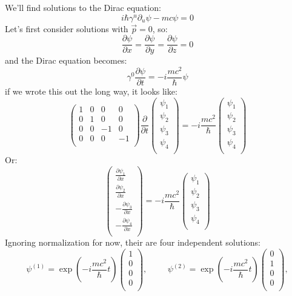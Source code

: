 \documentclass[12pt]{book}
\begin{document}
We'll find solutions to the Dirac equation:
$$i\hbar \gamma^u \partial_u \psi -mc \psi = 0$$
Let's first consider solutions with $\vec{p}=0$, so:
$$\frac{\partial\psi}{\partial x} = \frac{\partial\psi}{\partial y} = \frac{\partial\psi}{\partial z} = 0$$
and the Dirac equation becomes:
$$\gamma^0 \frac{\partial \psi}{\partial t} = -i \frac{mc^2}{\hbar} \psi $$
if we wrote this out the long way, it looks like:
$$
\begin{pmatrix} 
1 & 0 & 0 & 0\\
0 & 1 & 0 & 0\\
0 & 0 &-1 & 0\\
0 & 0 & 0 &-1\\
\end{pmatrix}
\frac{\partial}{\partial t}
\begin{pmatrix} 
\psi_1\\
\psi_2\\
\psi_3\\
\psi_4\\
\end{pmatrix}
=
-i \frac{mc^2}{\hbar}
\begin{pmatrix} 
\psi_1\\
\psi_2\\
\psi_3\\
\psi_4\\
\end{pmatrix}
$$
Or:
$$
\begin{pmatrix} 
\displaystyle \frac{\partial \psi_1}{\partial x}\\[8pt]
\displaystyle \frac{\partial \psi_2}{\partial x}\\[8pt]
\displaystyle -\frac{\partial \psi_3}{\partial x}\\[8pt]
\displaystyle -\frac{\partial \psi_4}{\partial x}\\[8pt]
\end{pmatrix}
=
-i \frac{mc^2}{\hbar}
\begin{pmatrix} 
\psi_1\\
\psi_2\\
\psi_3\\
\psi_4\\
\end{pmatrix}
$$
Ignoring normalization for now, their are four independent solutions:
$$
\psi^{(1)} = \exp\left(- i \frac{mc^2}{\hbar} t\right)
\begin{pmatrix} 
1\\
0\\
0\\
0\\
\end{pmatrix},
\hspace{1cm}
\psi^{(2)} = \exp\left(- i \frac{mc^2}{\hbar} t\right)
\begin{pmatrix} 
0\\
1\\
0\\
0\\
\end{pmatrix},
$$
\end{document}
